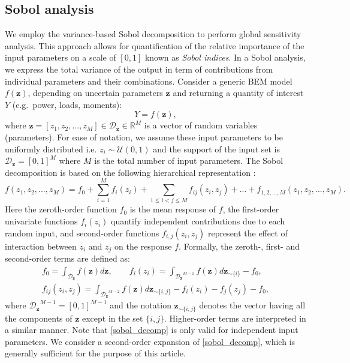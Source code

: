 \subsection{Sobol analysis}
We employ the variance-based Sobol decomposition to perform global sensitivity analysis. This approach allows for quantification of the relative importance of the input parameters on a scale of $[0,1]$ known as \emph{Sobol indices}. In a Sobol analysis, we express the total variance of the output in term of contributions from individual parameters and their combinations. Consider a generic BEM model $f(\mathbf{z})$, depending on uncertain parameters $\mathbf{z}$ and returning a quantity of interest $Y$ (e.g.\ power, loads, moments):
\begin{equation}\label{nonlinear_model}
Y = f({\mathbf{z}}),
\end{equation}
where ${\mathbf{z}} = [z_1, z_2, ..., z_M]\in \mathcal{D}_{\mathbf{z}}\in \mathbb{R}^M$ is a vector of random variables (parameters). For ease of notation, we assume these input parameters to be uniformly distributed i.e. $z_i \sim \mathcal{U}(0,1)$ and the support of the input set is $\mathcal{D}_{\mathbf{z}} = [0,1]^M$ where $M$ is the total number of input parameters. The Sobol decomposition is based on the following hierarchical representation \cite{RSmith}:
\begin{equation}\label{sobol_decomp}
f(z_1, z_2, ..., z_M) = f_0+\sum_{i=1}^M f_i(z_i) + \sum_{1\leq i<j\leq M} f_{ij}(z_i,z_j) + ... + f_{1, 2, ..., M}(z_1, z_2, ..., z_M).
\end{equation}
Here the zeroth-order function $f_0$ is the mean response of $f$, the first-order univariate functions $f_i(z_i)$ quantify independent contributions due to each random input, and second-order functions $f_{i,j}(z_i,z_j)$ represent the effect of interaction between $z_i$ and $z_j$ on the response $f$. Formally, the zeroth-, first- and second-order terms are defined as:
\begin{align}\label{sobol_terms}
f_0 = \int_{\mathcal{D}_{\mathbf{z}}}f(\mathbf{z})d\mathbf{z}, \qquad  f_i(z_i)= \int_{{\mathcal{D}_{\mathbf{z}}}^{M-1}}f(\mathbf{z})d\mathbf{z}_{\sim \{i\}} - f_0,\\
f_{ij}(z_i,z_j) = \int_{{\mathcal{D}_{\mathbf{z}}}^{M-2}}f(\mathbf{z})d\mathbf{z}_{\sim \{i,j\}} - f_i(z_i) - f_j(z_j) - f_0,
\end{align}
where ${\mathcal{D}_{\mathbf{z}}}^{M-1} = [0,1]^{M-1}$ and the notation $\mathbf{z}_{\sim \{i,j\}}$ denotes the vector having all the components of $\mathbf{z}$ except in the set $\{i,j\}$. Higher-order terms are interpreted in a similar manner. Note that \eqref{sobol_decomp} is only valid for independent input parameters. We consider a second-order expansion of \eqref{sobol_decomp}, which is generally sufficient for the purpose of this article. 

